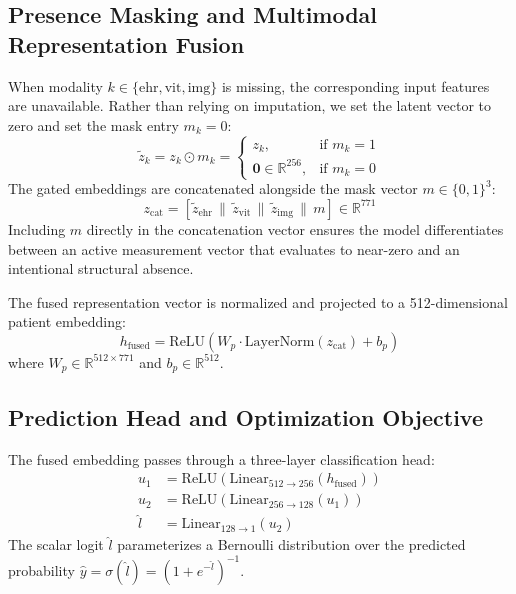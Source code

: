 \documentclass[10pt,conference]{IEEEtran}
\begin{document}
\subsection{Presence Masking and Multimodal Representation Fusion}
When modality $k \in \{\text{ehr}, \text{vit}, \text{img}\}$ is missing, the corresponding input features are unavailable. Rather than relying on imputation, we set the latent vector to zero and set the mask entry $m_k = 0$:
\begin{equation}
    \tilde{z}_k = z_k \odot m_k = \begin{cases}
        z_k, & \text{if } m_k = 1 \\
        \mathbf{0} \in \mathbb{R}^{256}, & \text{if } m_k = 0
    \end{cases}
\end{equation}
The gated embeddings are concatenated alongside the mask vector $m \in \{0, 1\}^3$:
\begin{equation}
    z_{\mathrm{cat}} = \left[ \tilde{z}_{\mathrm{ehr}} \,\|\, \tilde{z}_{\mathrm{vit}} \,\|\, \tilde{z}_{\mathrm{img}} \,\|\, m \right] \in \mathbb{R}^{771}
\end{equation}
Including $m$ directly in the concatenation vector ensures the model differentiates between an active measurement vector that evaluates to near-zero and an intentional structural absence.

The fused representation vector is normalized and projected to a 512-dimensional patient embedding:
\begin{equation}
    h_{\mathrm{fused}} = \text{ReLU}\left(W_p \cdot \text{LayerNorm}(z_{\mathrm{cat}}) + b_p\right)
\end{equation}
where $W_p \in \mathbb{R}^{512 \times 771}$ and $b_p \in \mathbb{R}^{512}$.

\subsection{Prediction Head and Optimization Objective}
The fused embedding passes through a three-layer classification head:
\begin{align}
    u_1 &= \text{ReLU}(\text{Linear}_{512 \to 256}(h_{\mathrm{fused}})) \\
    u_2 &= \text{ReLU}(\text{Linear}_{256 \to 128}(u_1)) \\
    \hat{l} &= \text{Linear}_{128 \to 1}(u_2)
\end{align}
The scalar logit $\hat{l}$ parameterizes a Bernoulli distribution over the predicted probability $\hat{y} = \sigma(\hat{l}) = (1 + e^{-\hat{l}})^{-1}$.
\end{document}
